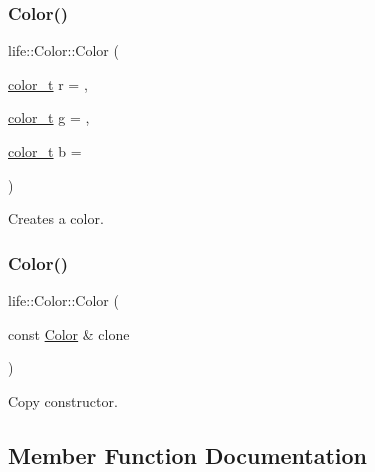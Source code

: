 \subsubsection{\texorpdfstring{Color()}{Color()}\hspace{0.1cm}{\footnotesize\ttfamily [1/2]}}
{\footnotesize\ttfamily life\+::\+Color\+::\+Color (\begin{DoxyParamCaption}\item[{\mbox{\hyperlink{structlife_1_1_color_ab392ce7ebd8204f1447c7e296dde9a17}{color\+\_\+t}}}]{r = {},  }\item[{\mbox{\hyperlink{structlife_1_1_color_ab392ce7ebd8204f1447c7e296dde9a17}{color\+\_\+t}}}]{g = {},  }\item[{\mbox{\hyperlink{structlife_1_1_color_ab392ce7ebd8204f1447c7e296dde9a17}{color\+\_\+t}}}]{b = {} }\end{DoxyParamCaption})\hspace{0.3cm}{\ttfamily [inline]}}



Creates a color. 

\mbox{\label{structlife_1_1_color_a4c5b4ec3378b240824d16ae0e7870b44}} 
\subsubsection{\texorpdfstring{Color()}{Color()}\hspace{0.1cm}{\footnotesize\ttfamily [2/2]}}
{\footnotesize\ttfamily life\+::\+Color\+::\+Color (\begin{DoxyParamCaption}\item[{const \mbox{\hyperlink{structlife_1_1_color}{Color}} \&}]{clone }\end{DoxyParamCaption})\hspace{0.3cm}{\ttfamily [inline]}}



Copy constructor. 



\subsection{Member Function Documentation}
\mbox{\label{structlife_1_1_color_a36338f7acd471d208faeffae1e24bcf2}} 
